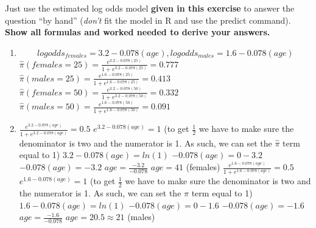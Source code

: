 \documentclass[
]{article}
\providecommand{\tightlist}{%
  \setlength{\itemsep}{0pt}\setlength{\parskip}{0pt}}
\begin{document}
Just use the estimated log odds model \textbf{given in this exercise} to
answer the question ``by hand'' (\emph{don't} fit the model in R and use
the predict command). \textbf{Show all formulas and worked needed to
derive your answers.}

\begin{enumerate}
\def\labelenumi{\alph{enumi}.}
\tightlist
\item
  \[
  logodds_{females} = 3.2 - 0.078(age),logodds_{males} = 1.6 - 0.078(age)
  \]
  \(\hat \pi(females = 25) = \frac{e^{3.2 - 0.078(25)}}{1 + e^{3.2 - 0.078(25)}} = 0.777\)
  \newline
  \(\hat \pi(males = 25) = \frac{e^{1.6 - 0.078(25)}}{1 + e^{1.6 - 0.078(25)}} = 0.413\)
  \newline
  \(\hat \pi(females = 50) = \frac{e^{3.2 - 0.078(50)}}{1 + e^{3.2 - 0.078(50)}} = 0.332\)
  \newline
  \(\hat \pi(males = 50) = \frac{e^{1.6 - 0.078(50)}}{1 + e^{1.6 - 0.078(50)}} = 0.091\)
  \newline \newline
\item
  \(\frac{e^{3.2 - 0.078(age)}}{1 + e^{3.2 - 0.078(age)}} = 0.5\)
  \newline \(e^{3.2 - 0.078(age)} = 1\) (to get \(\frac{1}{2}\) we have
  to make sure the denominator is two and the numerator is 1. As such,
  we can set the \(\hat \pi\) term equal to 1) \newline
  \(3.2 - 0.078(age) = ln(1)\) \newline \(-0.078(age) = 0 - 3.2\)
  \newline \(-0.078(age) = -3.2\) \newline \(age = \frac{-3.2}{-0.078}\)
  \newline \(age = 41\) (females) \newline \newline
  \(\frac{e^{1.6 - 0.078(age)}}{1 + e^{1.6 - 0.078(age)}} = 0.5\)
  \newline \(e^{1.6 - 0.078(age)} = 1\) (to get \(\frac{1}{2}\) we have
  to make sure the denominator is two and the numerator is 1. As such,
  we can set the \(\hat \pi\) term equal to 1) \newline
  \(1.6 - 0.078(age) = ln(1)\) \newline \(-0.078(age) = 0 - 1.6\)
  \newline \(-0.078(age) = -1.6\) \newline \(age = \frac{-1.6}{-0.078}\)
  \newline \(age = 20.5 \approx 21\) (males) \newline
\end{enumerate}
\end{document}
